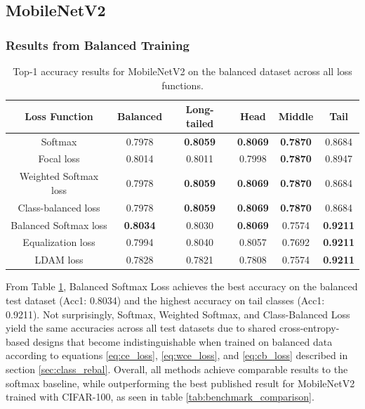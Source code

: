 
\subsection{MobileNetV2}

\subsubsection{Results from Balanced Training}

\begin{table}[H]
    \centering
    \caption{Top-1 accuracy results for MobileNetV2 on the balanced dataset across all loss functions.}
    \begin{tabular}{cccccc}
        \toprule
        Loss Function & Balanced & Long-tailed & Head & Middle & Tail \\ 
        \midrule
        Softmax   & 0.7978   & \textbf{0.8059} & \textbf{0.8069} & \textbf{0.7870} & 0.8684 \\
        Focal loss   & 0.8014   & 0.8011 & 0.7998 & \textbf{0.7870} & 0.8947 \\
        Weighted Softmax loss   & 0.7978   & \textbf{0.8059} & \textbf{0.8069} & \textbf{0.7870} & 0.8684 \\
        Class-balanced loss   & 0.7978   & \textbf{0.8059} & \textbf{0.8069} & \textbf{0.7870} & 0.8684 \\
        Balanced Softmax loss   & \textbf{0.8034}  & 0.8030 & \textbf{0.8069} & 0.7574 & \textbf{0.9211} \\
        Equalization loss   & 0.7994   & 0.8040 & 0.8057 & 0.7692 & \textbf{0.9211} \\
        LDAM loss   &  0.7828   & 0.7821 & 0.7808 & 0.7574 & \textbf{0.9211} \\
        \bottomrule
    \end{tabular}
    \label{tab:mobilenet_bal_acc1_1}
\end{table}

From Table \ref{tab:mobilenet_bal_acc1_1}, Balanced Softmax Loss achieves the best accuracy on the balanced test dataset (Acc1: 0.8034) and the highest accuracy on tail classes (Acc1: 0.9211). Not surprisingly, Softmax, Weighted Softmax, and Class-Balanced Loss yield the same accuracies across all test datasets due to shared cross-entropy-based designs that become indistinguishable when trained on balanced data according to equations \eqref{eq:ce_loss}, \eqref{eq:wce_loss}, and \eqref{eq:cb_loss} described in section \ref{sec:class_rebal}. Overall, all methods achieve comparable results to the softmax baseline, while outperforming the best published result for MobileNetV2 trained with CIFAR-100, as seen in table \ref{tab:benchmark_comparison}.

